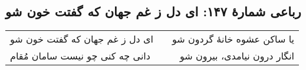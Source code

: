 \begin{center}
\section*{رباعی شمارهٔ ۱۴۷: ای دل ز غم جهان که گفتت خون شو}
\label{sec:147}
\begin{longtable}{l p{0.5cm} r}
ای دل ز غم جهان که گفتت خون شو
&&
یا ساکن عشوه خانهٔ گردون شو
\\
دانی چه کنی چو نیست سامان مُقام
&&
انگار درون نیامدی، بیرون شو
\\
\end{longtable}
\end{center}
